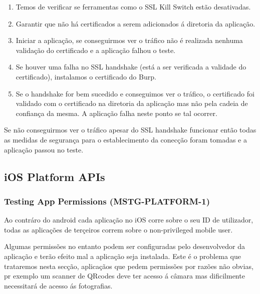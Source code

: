 \begin{enumerate}
\item Temos de verificar se ferramentas como o SSL Kill Switch estão desativadas.\par
\hfill\par
\item Garantir que não há certificados a serem adicionados á diretoria da aplicação.\par
\hfill\par
\item Iniciar a aplicação, se conseguirmos ver o tráfico não é realizada nenhuma validação do certificado e a aplicação falhou o teste.\par
\hfill\par
\item Se houver uma falha no SSL handshake (está a ser verificada a validade do certificado), instalamos o certificado do  Burp.\par
\hfill\par
\item Se o handshake for bem sucedido e conseguimos ver o tráfico, o certificado foi validado com o certificado na diretoria da aplicação mas não pela cadeia de confiança da mesma. A aplicação falha neste ponto se tal ocorrer.
\end{enumerate}


Se não conseguirmos ver o tráfico apesar do SSL handshake funcionar então todas as medidas de segurança para o establecimento da conecção foram tomadas e a aplicação passou no teste.


\subsection{iOS Platform APIs}
\hfill\par


\subsubsection{Testing App Permissions (MSTG-PLATFORM-1)}
\hfill\par
\hfill\par

Ao contráro do android  cada aplicação no iOS corre sobre o seu ID de utilizador, todas as aplicações de terçeiros correm sobre o non-privileged mobile user.

Algumas permissões no entanto podem ser configuradas pelo desenvolvedor da aplicação e terão efeito mal a aplicação seja instalada. Este é o problema que trataremos nesta secção, aplicaçãos que pedem permissões por razões não obvias, pr exemplo um scanner de QRcodes deve ter acesso á câmara mas dificilmente necessitará de acesso ás fotografias.\par
\hfill\par

